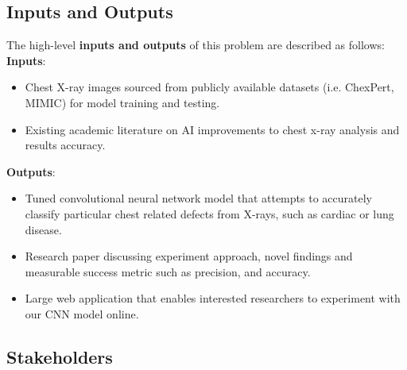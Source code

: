 \documentclass{article}
\begin{document}
\subsection{Inputs and Outputs}

The high-level \textbf{inputs and outputs} of this problem are described as follows:\\
\textbf{Inputs}:
\begin{itemize}
\item Chest X-ray images sourced from publicly available datasets (i.e. ChexPert, MIMIC) for model training and testing.
\item Existing academic literature on AI improvements to chest x-ray analysis and results accuracy.
\end{itemize}

\noindent \textbf{Outputs}:
\begin{itemize}
\item Tuned convolutional neural network model that attempts to accurately classify particular chest related defects from X-rays, such as cardiac or lung disease.
\item Research paper discussing experiment approach, novel findings and measurable success metric such as precision, and accuracy.
\item Large web application that enables interested researchers to experiment with our CNN model online.

\end{itemize} 

\subsection{Stakeholders}
\end{document}
